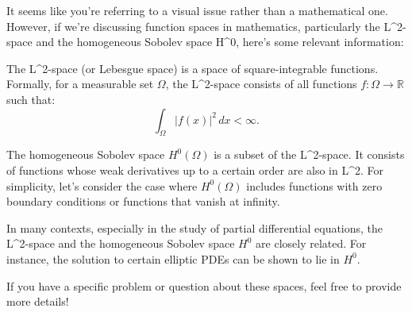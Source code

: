 It seems like you're referring to a visual issue rather than a mathematical one. However, if we're discussing function spaces in mathematics, particularly the L^2-space and the homogeneous Sobolev space H^0, here's some relevant information:

The L^2-space (or Lebesgue space) is a space of square-integrable functions. Formally, for a measurable set \( \Omega \), the L^2-space consists of all functions \( f: \Omega \to \mathbb{R} \) such that:
\[
\int_{\Omega} |f(x)|^2 \, dx < \infty.
\]

The homogeneous Sobolev space \( H^0(\Omega) \) is a subset of the L^2-space. It consists of functions whose weak derivatives up to a certain order are also in L^2. For simplicity, let's consider the case where \( H^0(\Omega) \) includes functions with zero boundary conditions or functions that vanish at infinity.

In many contexts, especially in the study of partial differential equations, the L^2-space and the homogeneous Sobolev space \( H^0 \) are closely related. For instance, the solution to certain elliptic PDEs can be shown to lie in \( H^0 \).

If you have a specific problem or question about these spaces, feel free to provide more details!